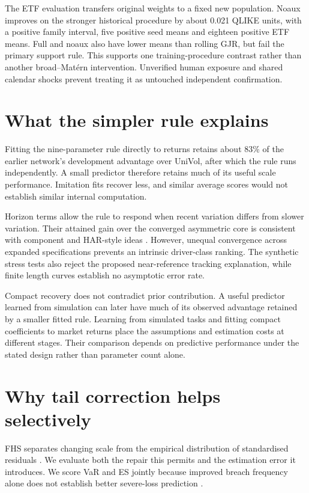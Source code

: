 The ETF evaluation transfers original weights to a fixed new population. Noaux improves on the stronger historical procedure by about 0.021 QLIKE units, with a positive family interval, five positive seed means and eighteen positive ETF means. Full and noaux also have lower means than rolling GJR, but fail the primary support rule. This supports one training-procedure contrast rather than another broad--Mat\'ern intervention. Unverified human exposure and shared calendar shocks prevent treating it as untouched independent confirmation.

\section{What the simpler rule explains}

Fitting the nine-parameter rule directly to returns retains about 83\% of the earlier network's development advantage over UniVol, after which the rule runs independently. A small predictor therefore retains much of its useful scale performance. Imitation fits recover less, and similar average scores would not establish similar internal computation.

Horizon terms allow the rule to respond when recent variation differs from slower variation. Their attained gain over the converged asymmetric core is consistent with component and HAR-style ideas \citep{engle1999permanent,corsi2009simple}. However, unequal convergence across expanded specifications prevents an intrinsic driver-class ranking. The synthetic stress tests also reject the proposed near-reference tracking explanation, while finite length curves establish no asymptotic error rate.

Compact recovery does not contradict prior contribution. A useful predictor learned from simulation can later have much of its observed advantage retained by a smaller fitted rule. Learning from simulated tasks and fitting compact coefficients to market returns place the assumptions and estimation costs at different stages. Their comparison depends on predictive performance under the stated design rather than parameter count alone.

\section{Why tail correction helps selectively}

FHS separates changing scale from the empirical distribution of standardised residuals \citep{baroneadesi1999var}. We evaluate both the repair this permits and the estimation error it introduces. We score VaR and ES jointly because improved breach frequency alone does not establish better severe-loss prediction \citep{fissler2016higher,patton2019dynamic}.

